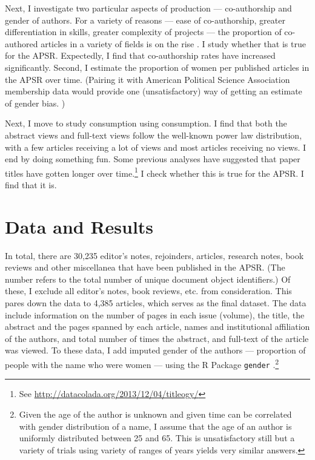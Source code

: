 \documentclass[12pt]{article}
\begin{document}
Next, I investigate two particular aspects of production --- co-authorship and gender of authors. For a variety of reasons --- ease of co-authorship, greater differentiation in skills, greater complexity of projects --- the proportion of co-authored articles in a variety of fields is on the rise \citep{barnett1988rising, card2013nine, cunningham1997authorship}. I study whether that is true for the APSR. Expectedly, I find that co-authorship rates have increased significantly. Second, I estimate the proportion of women per published articles in the APSR over time. (Pairing it with American Political Science Association membership data would provide one (unsatisfactory) way of getting an estimate of gender bias.   )

Next, I move to study consumption using consumption. I find that both the abstract views and full-text views follow the well-known power law distribution, with a few articles receiving a lot of views and most articles receiving no views. I end by doing something fun. Some previous analyses have suggested that paper titles have gotten longer over time.\footnote{See \href{http://datacolada.org/2013/12/04/titleogy/}{http://datacolada.org/2013/12/04/titleogy/}} I check whether this is true for the APSR. I find that it is.

\section*{Data and Results} 
In total, there are 30,235 editor's notes, rejoinders, articles, research notes, book reviews and other miscellanea that have been published in the APSR. (The number refers to the total number of unique document object identifiers.) Of these, I exclude all editor's notes, book reviews, etc. from consideration. This pares down the data to 4,385 articles, which serves as the final dataset. The data include information on the number of pages in each issue (volume), the title, the abstract and the pages spanned by each article, names and institutional affiliation of the authors, and total number of times the abstract, and full-text of the article was viewed. To these data, I add imputed gender of the authors --- proportion of people with the name who were women --- using the R Package {\tt gender} \citet{lincoln2015}.\footnote{Given the age of the author is unknown and given time can be correlated with gender distribution of a name, I assume that the age of an author is uniformly distributed between 25 and 65. This is unsatisfactory still but a variety of trials using variety of ranges of years yields very similar answers.}
\end{document}
